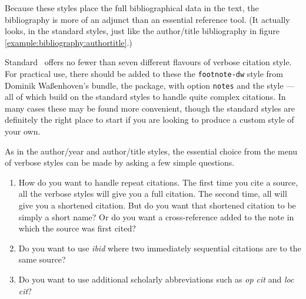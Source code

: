 Because these styles place the full bibliographical data in the text,
the bibliography is more of an adjunct than an essential reference
tool. (It actually looks, in the standard styles, just like the
author/title bibliography in figure
\ref{example:bibliography:authortitle}.)

Standard \biblatex\ offers no fewer than seven different flavours of
verbose citation style. For practical use, there should be added to
these the \verb|footnote-dw| style from Dominik Waßenhoven's
 bundle, the 
package, with option \verb|notes| and the  style ---
all of which build on the standard styles to handle quite complex
citations. In many cases these may be found more convenient, though
the standard styles are definitely the right place to start if you are
looking to produce a custom style of your own.

As in the author/year and author/title styles, the essential choice
from the menu of verbose styles can be made by asking a few simple
questions.
\begin{enumerate}
\item How do you want to handle repeat citations. The first time you
  cite a source, all the verbose styles will give you a full
  citation. The second time, all will give you a shortened
  citation. But do you want that shortened citation to be simply a
  short name? Or do you want a cross-reference added to the note in
  which the source was first cited?
\item Do you want to use \emph{ibid} where two immediately sequential citations
  are to the same source?
\item Do you want to use additional scholarly abbreviations such as
  \emph{op cit} and \emph{loc cit}?
\end{enumerate}


